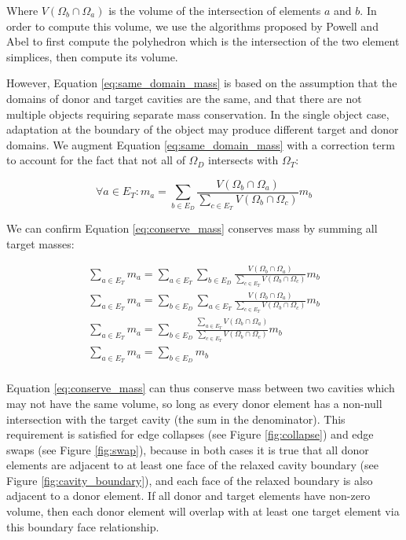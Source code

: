Where $V(\Omega_b \cap \Omega_a)$ is the volume of the intersection of elements $a$ and $b$.
In order to compute this volume, we use the algorithms
proposed by Powell and Abel \cite{powell2015exact} to first compute the polyhedron
which is the intersection of the two element simplices, then compute
its volume.

However, Equation \ref{eq:same_domain_mass} is based on the assumption
that the domains of donor and target cavities are the same, and that
there are not multiple objects requiring separate mass conservation.
In the single object case, adaptation at the boundary of the object may
produce different target and donor domains.
We augment Equation \ref{eq:same_domain_mass} with a correction term
to account for the fact that not all of $\Omega_D$ intersects with $\Omega_T$:

\begin{equation} \label{eq:conserve_mass}
\forall a \in E_T: m_a
= \sum_{b \in E_D} \frac{V(\Omega_b \cap \Omega_a)}
{\sum_{c \in E_T} V(\Omega_b \cap \Omega_c)} m_b
\end{equation}

We can confirm Equation \ref{eq:conserve_mass} conserves mass by
summing all target masses:

\begin{gather*}
\sum_{a \in E_T} m_a
= \sum_{a \in E_T} \sum_{b \in E_D} \frac{V(\Omega_b \cap \Omega_a)}
{\sum_{c \in E_T} V(\Omega_b \cap \Omega_c)} m_b \\
\sum_{a \in E_T} m_a
= \sum_{b \in E_D} \sum_{a \in E_T} \frac{V(\Omega_b \cap \Omega_a)}
{\sum_{c \in E_T} V(\Omega_b \cap \Omega_c)} m_b \\
\sum_{a \in E_T} m_a
= \sum_{b \in E_D} \frac{\sum_{a \in E_T} V(\Omega_b \cap \Omega_a)}
{\sum_{c \in E_T} V(\Omega_b \cap \Omega_c)} m_b \\
\sum_{a \in E_T} m_a
= \sum_{b \in E_D} m_b \\
\end{gather*}

Equation \ref{eq:conserve_mass} can thus conserve mass between
two cavities which may not have the same volume, so long as every
donor element has a non-null intersection with the target cavity
(the sum in the denominator).
This requirement is satisfied for edge collapses (see Figure
\ref{fig:collapse}) and edge swaps (see Figure \ref{fig:swap}),
because in both cases it is true that
all donor elements are adjacent to at least one face of
the relaxed cavity boundary (see Figure \ref{fig:cavity_boundary}),
and each face of the relaxed boundary is also adjacent to
a donor element.
If all donor and target elements have non-zero volume, then
each donor element will overlap with at least one target element
via this boundary face relationship.

